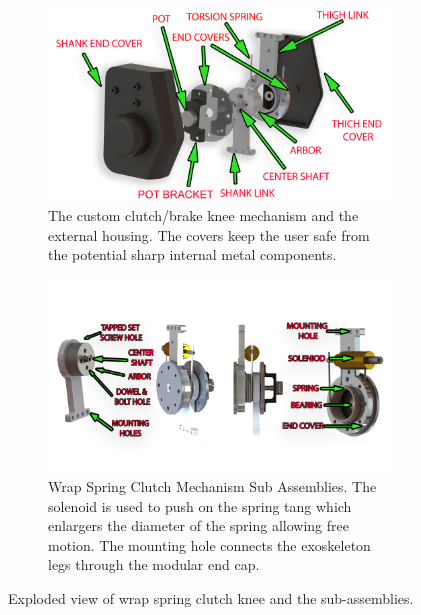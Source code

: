 \begin{figure}
    \begin{subfigure}{\textwidth}
        \centering
        \captionsetup{justification=centering}
        \centerline{
        \includegraphics[scale=0.16]{images/mech_design/knee exploded view_edit2.png}}
        \caption[Custom Knee Mechanism]{The custom clutch/brake knee mechanism and the external housing. The covers keep the user safe from the potential sharp internal metal components. }
        \label{fig:kneemechASM}
    \end{subfigure}
    \begin{subfigure}{\textwidth}
        \centering
        \captionsetup{justification=centering}
        \centerline{
        \includegraphics[scale=0.3]{images/mech_design/all_knee.png}}
        \caption[Wrap Spring Clutch Mechanism]{Wrap Spring Clutch Mechanism Sub Assemblies. The solenoid is used to push on the spring tang which enlargers the diameter of the spring  allowing free motion. The mounting hole connects the exoskeleton legs through the modular end cap. }
        \label{fig:subknee}
    \end{subfigure}    
    \caption[Wrap spring clutch knee]{Exploded view of wrap spring clutch knee and the sub-assemblies.}
    \label{fig:kneemech}
\end{figure}

